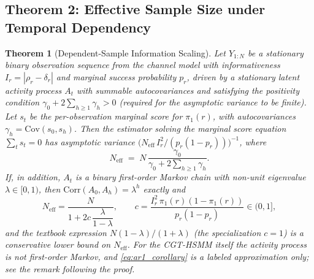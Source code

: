 \documentclass[11pt,a4paper]{article}
\newtheorem{theorem}{Theorem}
\begin{document}
\subsection{Theorem 2: Effective Sample Size under Temporal Dependency}
\begin{theorem}[Dependent-Sample Information Scaling]
Let $Y_{1:N}$ be a stationary binary observation sequence from the channel model with informativeness $I_r = |\rho_r - \delta_r|$ and marginal success probability $p_r$, driven by a stationary latent activity process $A_t$ with summable autocovariances and satisfying the positivity condition $\gamma_0 + 2\sum_{h \ge 1} \gamma_h > 0$ (required for the asymptotic variance to be finite). Let $s_t$ be the per-observation marginal score for $\pi_1(r)$, with autocovariances $\gamma_h = \mathrm{Cov}(s_0, s_h)$. Then the estimator solving the marginal score equation $\sum_t s_t = 0$ has asymptotic variance $\big( N_{\mathrm{eff}}\, I_r^2 / (p_r(1-p_r)) \big)^{-1}$, where %
\begin{equation}\label{eq:dependent_fisher}
N_{\mathrm{eff}} \;=\; N\, \frac{\gamma_0}{\gamma_0 + 2 \sum_{h \ge 1} \gamma_h}. %
\end{equation}
If, in addition, $A_t$ is a \emph{binary first-order Markov chain} with non-unit eigenvalue $\lambda \in [0, 1)$, then $\mathrm{Corr}(A_0, A_h) = \lambda^h$ exactly and %
\begin{equation}\label{eq:ar1_corollary}
N_{\mathrm{eff}} = \frac{N}{1 + 2c\, \dfrac{\lambda}{1 - \lambda}}, \qquad c = \frac{I_r^2\, \pi_1(r)(1 - \pi_1(r))}{p_r(1 - p_r)} \in (0, 1], %
\end{equation}
and the textbook expression $N(1-\lambda)/(1+\lambda)$ (the specialization $c = 1$) is a conservative lower bound on $N_{\mathrm{eff}}$. For the CGT-HSMM itself the activity process is \emph{not} first-order Markov, and \eqref{eq:ar1_corollary} is a labeled approximation only; see the remark following the proof. %
\end{theorem}
\end{document}
